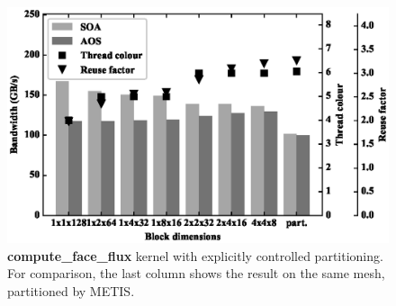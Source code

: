 \begin{figure}[Htbp]
  \centering
  \includegraphics[width=12cm]{fig/mini_aero_block.eps}
  \caption{\textbf{compute\_face\_flux} kernel with explicitly controlled
  partitioning. For comparison, the last column shows the result on the same
  mesh, partitioned by METIS.}
  \label{fig:mini_aero_block}
\end{figure}


